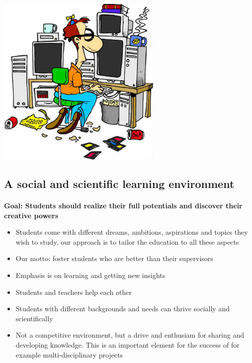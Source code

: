\documentclass[%
twoside,                 %
final,                   %
10pt]{article}
\begin{document}


\centerline{\includegraphics[width=1.0\linewidth]{fig-future/computer_nerd2.jpg}}




\subsection*{A social and scientific learning environment}


\paragraph{}
\textbf{Goal: Students should realize their full potentials and discover their creative powers}

\begin{itemize}
 \item Students come with different dreams, ambitions, aspirations and topics they wish to study, our approach is to tailor the education to all these aspects

 \item Our motto: foster students who are better than their supervisors

 \item Emphasis is on learning and getting new insights

 \item Students and teachers help each other

 \item Students with different backgrounds and needs can thrive socially and scientifically

 \item Not a competitive environment, but a drive and enthusiam for sharing and developing knowledge. This is an important element for the  success of for example multi-disciplinary projects 
\end{itemize}
\end{document}
